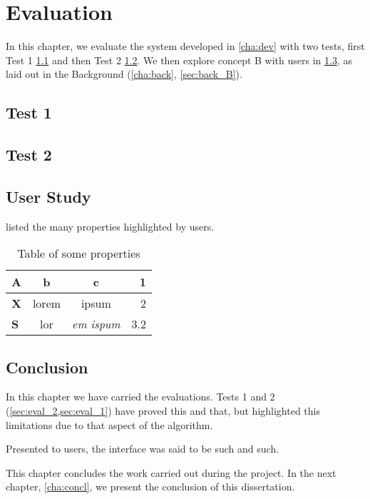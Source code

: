 \chapter{Evaluation}
\label{cha:eval}

In this chapter, we evaluate the system developed in \cref{cha:dev} with two tests, first Test 1 \cref{sec:eval_1} and then Test 2 \cref{sec:eval_2}. We then explore concept B with users in \cref{sec:eval_user}, as laid out in the Background (\cref{cha:back}, \cref{sec:back_B}). 

\section{Test 1}
\label{sec:eval_1}

\section{Test 2}
\label{sec:eval_2}

\section{User Study}
\label{sec:eval_user}

 listed the many properties highlighted by users.

\begin{table}[h]
    \centering
    \begin{tabular}{ l || c c | r }
        \textbf{A} & b & c & 1 \\ \hline
        \textbf{X} & lorem & ipsum & 2 \\
        \textbf{S} & lor & \textit{em ispum} & 3.2 
    \end{tabular}
    \caption{Table of some properties}
    \label{tab:properties table}
\end{table}

\section{Conclusion}
\label{sec:eval_concl}

In this chapter we have carried the evaluations. Tests 1 and 2 (\cref{sec:eval_2,sec:eval_1}) have proved this and that, but highlighted this limitations due to that aspect of the algorithm.

Presented to users, the interface was said to be such and such.

This chapter concludes the work carried out during the project. In the next chapter, \cref{cha:concl}, we present the conclusion of this dissertation.